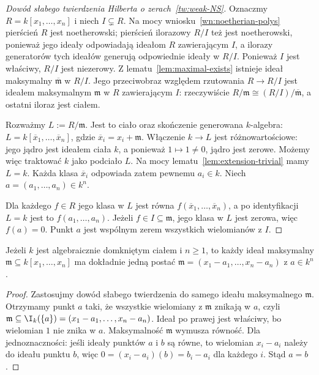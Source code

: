 \begin{proof}[Dowód słabego twierdzenia Hilberta o zerach~\ref{tw:weak-NS}]
Oznaczmy $R=k[x_1,\dots,x_n]$ i niech $I\subsetneq R$.
Na mocy wniosku~\ref{wn:noetherian-polys} pierścień $R$
jest noetherowski; pierścień ilorazowy $R/I$ też jest
noetherowski, ponieważ jego ideały odpowiadają ideałom $R$
zawierającym $I$, a ilorazy generatorów tych ideałów generują
odpowiednie ideały w $R/I$.
Ponieważ $I$ jest właściwy, $R/I$ jest niezerowy.
Z lematu~\ref{lem:maximal-exists} istnieje ideał maksymalny
$\overline{\mathfrak m}$ w $R/I$.
Jego przeciwobraz względem rzutowania $R\to R/I$
jest ideałem maksymalnym $\mathfrak m$ w $R$ zawierającym $I$:
rzeczywiście $R/\mathfrak m\cong(R/I)/\overline{\mathfrak m}$,
a ostatni iloraz jest ciałem.

Rozważmy $L:=R/\mathfrak m$.
Jest to ciało oraz skończenie generowana $k$-algebra:
$L=k[\overline x_1,\dots,\overline x_n]$,
gdzie $\overline x_i=x_i+\mathfrak m$.
Włączenie $k\to L$ jest różnowartościowe: jego jądro jest
ideałem ciała $k$, a ponieważ $1\mapsto1\ne0$,
jądro jest zerowe. Możemy więc traktować $k$ jako podciało $L$.
Na mocy lematu~\ref{lem:extension-trivial} mamy $L=k$.
Każda klasa $\overline x_i$ odpowiada zatem pewnemu
$a_i\in k$. Niech $a=(a_1,\dots,a_n)\in k^n$.

Dla każdego $f\in R$ jego klasa w $L$ jest równa
$f(\overline x_1,\dots,\overline x_n)$, a po identyfikacji
$L=k$ jest to $f(a_1,\dots,a_n)$.
Jeżeli $f\in I\subseteq\mathfrak m$, jego klasa w $L$
jest zerowa, więc $f(a)=0$.
Punkt $a$ jest wspólnym zerem wszystkich wielomianów z $I$.
\end{proof}

\begin{wniosek}
\label{wn:maximal-point}
Jeżeli $k$ jest algebraicznie domkniętym ciałem i $n\ge1$,
to każdy ideał maksymalny $\mathfrak m\subseteq k[x_1,\dots,x_n]$
ma dokładnie jedną postać
$\mathfrak m=(x_1-a_1,\dots,x_n-a_n)$ z $a\in k^n$.
\end{wniosek}
\begin{proof}
Zastosujmy dowód słabego twierdzenia do samego ideału
maksymalnego $\mathfrak m$.
Otrzymamy punkt $a$ taki, że wszystkie wielomiany z
$\mathfrak m$ znikają w $a$, czyli
$\mathfrak m\subseteq\I_k(\{a\})=(x_1-a_1,\dots,x_n-a_n)$.
Ideał po prawej jest właściwy, bo wielomian $1$ nie znika w $a$.
Maksymalność $\mathfrak m$ wymusza równość.
Dla jednoznaczności: jeśli ideały punktów $a$ i $b$ są równe,
to wielomian $x_i-a_i$ należy do ideału punktu $b$,
więc $0=(x_i-a_i)(b)=b_i-a_i$ dla każdego $i$.
Stąd $a=b$.
\end{proof}

